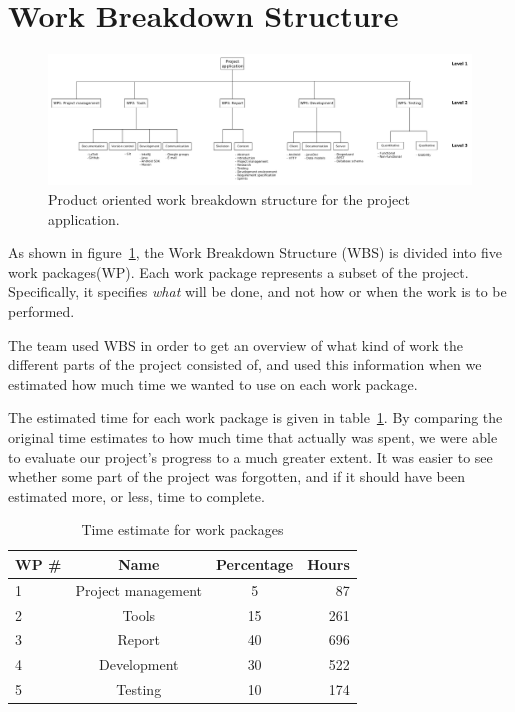 \section{Work Breakdown Structure}

\begin{figure}[H]
\includegraphics[width=\textwidth]{ch/prestudy/fig/wbs.png}
\caption{Product oriented work breakdown structure for the project application.}
\label{fig:wbs}
\end{figure}

As shown in figure~\ref{fig:wbs}, the Work Breakdown Structure (WBS) is divided into five work packages(WP). Each work package represents a subset of the project. Specifically, it specifies \emph{what} will be done, and not how or when the work is to be performed.

The team used WBS in order to get an overview of what kind of work the different parts of the project consisted of, and used this information when we estimated how much time we wanted to use on each work package.

The estimated time for each work package is given in table~\ref{tab:timeEstWP}. By comparing the original time estimates to how much time that actually was spent, we were able to evaluate our project's progress to a much greater extent. It was easier to see whether some part of the project was forgotten, and if it should have been estimated more, or less, time to complete.

\begin{table}[H]
\centering
{}
\begin{tabular}{|l|c|c|r|}
\hline
    \textbf{WP \#} & \textbf{Name} & \textbf{Percentage} & \textbf{Hours} \\\hline
    1 & Project management & 5 & 87\\\hline
    2 & Tools 			   & 15 & 261\\\hline
    3 & Report 			   & 40 & 696\\\hline
    4 & Development 	   & 30 & 522\\\hline
    5 & Testing  		   & 10 & 174\\\hline
\end{tabular}
\caption{Time estimate for work packages}
\label{tab:timeEstWP}
\end{table}